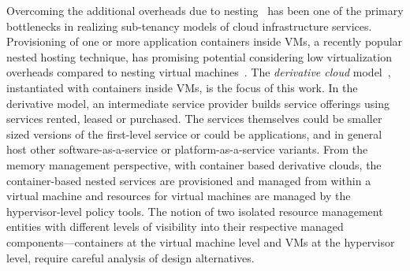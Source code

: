 Overcoming the additional overheads due to nesting~\cite{blanket,turtle}
has been one of the primary bottlenecks in realizing sub-tenancy
models of cloud infrastructure services.
%
%
Provisioning of one or more application containers inside VMs, 
a recently popular nested hosting technique, has promising 
potential considering 
low virtualization overheads compared
to nesting virtual machines~\cite{middleware16,vmw-docker}. 
%
%
The \emph{derivative cloud} model~\cite{spotcheck, google},
instantiated with containers inside VMs, is the focus of this work.
%
In the derivative model, an intermediate service provider builds
service offerings using services rented, leased or purchased.
%
The services themselves could be smaller sized versions of the
first-level service or could be applications, and in general host
other software-as-a-service or platform-as-a-service variants.
%
From the memory management perspective, with container based
derivative clouds, the container-based nested services
are provisioned and managed from within a virtual machine
and resources for virtual machines are managed by the 
hypervisor-level policy tools.
%
The notion of two isolated resource management entities with 
different levels of visibility into their respective managed 
components---containers at the virtual machine level and VMs at the
hypervisor level, require careful analysis of design alternatives.
%
%
%
%

